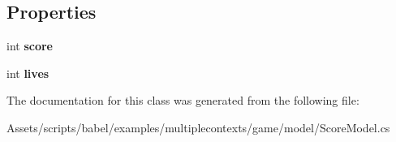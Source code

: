 \subsection*{Properties}
\begin{DoxyCompactItemize}
\item 
\hypertarget{classbabel_1_1examples_1_1multiplecontexts_1_1game_1_1_score_model_a7a4a84dd4d21c6606ffdeec5fb9e7a35}{int {\bfseries score}}\label{classbabel_1_1examples_1_1multiplecontexts_1_1game_1_1_score_model_a7a4a84dd4d21c6606ffdeec5fb9e7a35}

\item 
\hypertarget{classbabel_1_1examples_1_1multiplecontexts_1_1game_1_1_score_model_a82ae8bc0e6d0e4f8d8998b024d0e762d}{int {\bfseries lives}}\label{classbabel_1_1examples_1_1multiplecontexts_1_1game_1_1_score_model_a82ae8bc0e6d0e4f8d8998b024d0e762d}

\end{DoxyCompactItemize}


The documentation for this class was generated from the following file\-:\begin{DoxyCompactItemize}
\item 
Assets/scripts/babel/examples/multiplecontexts/game/model/Score\-Model.\-cs\end{DoxyCompactItemize}
